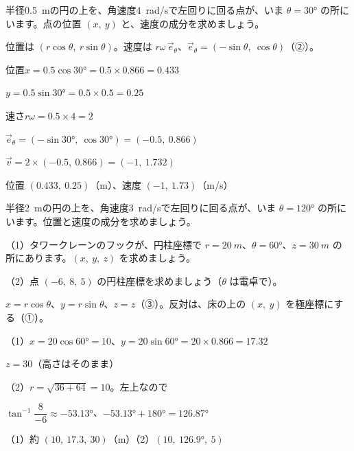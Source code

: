 \begin{reidai}
半径\qty{0.5}{m}の円の上を、角速度\qty{4}{rad/s}で左回りに回る点が、いま $\theta=30°$ の所にいます。点の位置 $(x,\ y)$ と、速度の成分を求めましょう。\par
\kangaekata 位置は $(r\cos\theta,\ r\sin\theta)$。速度は $r\omega\,\vec e_\theta$、$\vec e_\theta=(-\sin\theta,\ \cos\theta)$（②）。\par
\shiki 位置\enspace $x=0.5\cos30°=0.5\times0.866=0.433$\par
\hspace*{5.6\zw}$y=0.5\sin30°=0.5\times0.5=0.25$\par
\hspace*{2.6\zw}速さ\enspace $r\omega=0.5\times4=2$\par
\hspace*{2.6\zw}$\vec e_\theta=(-\sin30°,\ \cos30°)=(-0.5,\ 0.866)$\par
\hspace*{2.6\zw}$\vec v=2\times(-0.5,\ 0.866)=(-1,\ 1.732)$\par
\kotae 位置 $(0.433,\ 0.25)$（m）、速度 $(-1,\ 1.73)$（m/s）
\end{reidai}

\begin{jibun}
半径\qty{2}{m}の円の上を、角速度\qty{3}{rad/s}で左回りに回る点が、いま $\theta=120°$ の所にいます。位置と速度の成分を求めましょう。
\end{jibun}

\begin{reidai}[円柱座標]
（1）タワークレーンのフックが、円柱座標で $r=\qty{20}{m}$、$\theta=60°$、$z=\qty{30}{m}$ の所にあります。$(x,\ y,\ z)$ を求めましょう。\par
（2）点 $(-6,\ 8,\ 5)$ の円柱座標を求めましょう（$\theta$ は電卓で）。\par
\kangaekata $x=r\cos\theta$、$y=r\sin\theta$、$z=z$（③）。反対は、床の上の $(x,\ y)$ を極座標にする（①）。\par
\shiki（1）$x=20\cos60°=10$、\enspace $y=20\sin60°=20\times0.866=17.32$\par
\hspace*{4.6\zw}$z=30$（高さはそのまま）\par
\hspace*{2.6\zw}（2）$r=\sqrt{36+64}=10$。左上なので\par
\hspace*{4.6\zw}$\tan^{-1}\dfrac{8}{-6}\approx-53.13°$、\enspace $-53.13°+180°=126.87°$\par
\kotae （1）約 $(10,\ 17.3,\ 30)$（m）\quad（2）$(10,\ 126.9°,\ 5)$
\end{reidai}

